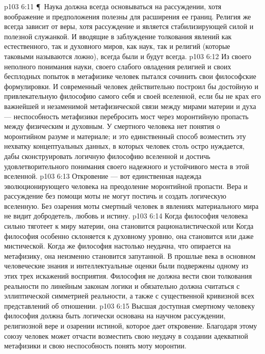 \vs p103 6:11 \P\ Наука должна всегда основываться на рассуждении, хотя воображение и предположения полезны для расширения ее границ. Религия же всегда зависит от веры, хотя рассуждение и является стабилизирующей силой и полезной служанкой. И вводящие в заблуждение толкования явлений как естественного, так и духовного миров, как наук, так и религий (которые таковыми называются ложно), всегда были и будут всегда.
\vs p103 6:12 Из своего неполного понимания науки, своего слабого овладения религией и своих бесплодных попыток в метафизике человек пытался сочинить свои философские формулировки. И современный человек действительно построил бы достойную и привлекательную философию самого себя и своей вселенной, если бы не крах его важнейшей и незаменимой метафизической связи между мирами материи и духа --- неспособность метафизики перебросить мост через моронтийную пропасть между физическим и духовным. У смертного человека нет понятия о моронтийном разуме и материале; и  это единственный способ возместить эту нехватку концептуальных данных, в которых человек столь остро нуждается, дабы сконструировать логичную философию вселенной и достичь удовлетворительного понимания своего надежного и устойчивого места в этой вселенной.
\vs p103 6:13 Откровение --- вот единственная надежда эволюционирующего человека на преодоление моронтийной пропасти. Вера и рассуждение без помощи моты не могут постичь и создать логическую вселенную. Без озарения моты смертный человек в явлениях материального мира не видит добродетель, любовь и истину.
\vs p103 6:14 Когда философия человека сильно тяготеет к миру материи, она становится рационалистической или  Когда философия особенно склоняется к духовному уровню, она становится  или даже мистической. Когда же философия настолько неудачна, что опирается на метафизику, она неизменно становится  запутанной. В прошлые века в основном человеческие знания и интеллектуальные оценки были подвержены одному из этих трех искажений восприятия. Философия не должна вести свои толкования реальности по линейным законам логики и обязательно должна считаться с эллиптической симметрией реальности, а также с существенной кривизной всех представлений об отношении.
\vs p103 6:15 Высшая доступная смертному человеку философия должна быть логически основана на научном рассуждении, религиозной вере и озарении истиной, которое дает откровение. Благодаря этому союзу человек может отчасти возместить свою неудачу в создании адекватной метафизики и свою неспособность понять моту моронтии.
